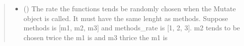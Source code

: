 \documentclass[letterpaper,10pt,english]{sphinxmanual}
\begin{document}
\begin{fulllineitems}
\begin{quote}
\begin{description}
\begin{itemize}
\item {} 
\sphinxAtStartPar
{} (\sphinxstyleliteralemphasis{\sphinxupquote{{[}}}\sphinxstyleliteralemphasis{\sphinxupquote{{]}}}) \textendash{} The rate the functions tends be randomly chosen when the Mutate object is called. It must
have the same lenght as methods. Suppose methods is {[}m1, m2, m3{]} and methods\_rate is  {[}1, 2, 3{]}. m2 tends to
be chosen twice the m1 is and m3 thrice the m1 is

\end{itemize}

\end{description}\end{quote}

\end{fulllineitems}

\end{document}
